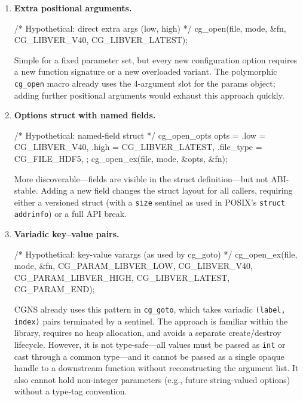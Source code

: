 \documentclass[11pt,letterpaper]{article}
\makeatletter
\let\cgns@orig@lstlisting\lstlisting
\let\cgns@endorig@lstlisting\endlstlisting
\renewenvironment{lstlisting}
  {\par\needspace{5\baselineskip}\nolinenumbers\cgns@orig@lstlisting}
  {\cgns@endorig@lstlisting\par\linenumbers}
\makeatother
\begin{document}
\begin{enumerate}[leftmargin=2em]

\item \textbf{Extra positional arguments.}
\begin{lstlisting}[language=C]
/* Hypothetical: direct extra args (low, high) */
cg_open(file, mode, &fn,
        CG_LIBVER_V40, CG_LIBVER_LATEST);
\end{lstlisting}
Simple for a fixed parameter set, but every new configuration option
requires a new function signature or a new overloaded variant.  The
polymorphic \texttt{cg\_open} macro already uses the 4-argument slot
for the params object; adding further positional arguments would
exhaust this approach quickly.

\item \textbf{Options struct with named fields.}
\begin{lstlisting}[language=C]
/* Hypothetical: named-field struct */
cg_open_opts opts = {
    .low       = CG_LIBVER_V40,
    .high      = CG_LIBVER_LATEST,
    .file_type = CG_FILE_HDF5,
};
cg_open_ex(file, mode, &opts, &fn);
\end{lstlisting}
More discoverable---fields are visible in the struct definition---but
not ABI-stable.  Adding a new field changes the struct layout for all
callers, requiring either a versioned struct (with a \texttt{size}
sentinel as used in POSIX's \texttt{struct addrinfo}) or a full API
break.

\item \textbf{Variadic key--value pairs.}
\begin{lstlisting}[language=C]
/* Hypothetical: key-value varargs (as used by cg_goto) */
cg_open_ex(file, mode, &fn,
           CG_PARAM_LIBVER_LOW,  CG_LIBVER_V40,
           CG_PARAM_LIBVER_HIGH, CG_LIBVER_LATEST,
           CG_PARAM_END);
\end{lstlisting}
CGNS already uses this pattern in \texttt{cg\_goto}, which takes
variadic \texttt{(label, index)} pairs terminated by a sentinel.
The approach is familiar within the library, requires no heap
allocation, and avoids a separate create/destroy lifecycle.  However,
it is not type-safe---all values must be passed as \texttt{int} or
cast through a common type---and it cannot be passed as a single
opaque handle to a downstream function without reconstructing the
argument list.  It also cannot hold non-integer parameters (e.g.,
future string-valued options) without a type-tag convention.


\end{enumerate}
\end{document}
